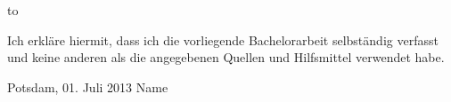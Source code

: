 \thispagestyle{empty}
\vspace*{24\baselineskip}
\hbox to \textwidth{\hrulefill}
\par
Ich erkläre hiermit, dass ich die vorliegende Bachelorarbeit selbständig verfasst und keine anderen als die angegebenen Quellen und Hilfsmittel verwendet habe.

Potsdam, 01. Juli 2013
\newline
\newline
\newline
\newline
\newline
Name

\clearpage